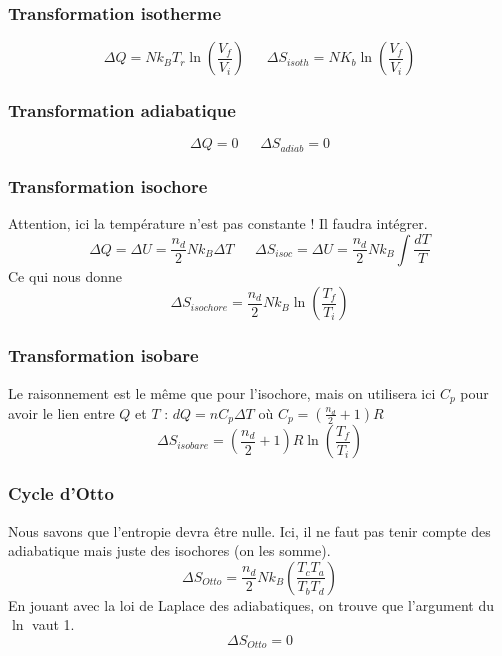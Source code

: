 \documentclass	[11pt, a4paper, openany]{book}
\begin{document}
\subsubsection{Transformation isotherme}
\begin{equation}
	\Delta Q = Nk_BT_r\ln\left(\frac{V_f}{V_i}\right)\ \ \ \ \ \ \ \Delta S_{isoth} = NK_b\ln\left(\frac{V_f}{V_i}\right)
\end{equation}

\subsubsection{Transformation adiabatique}
\begin{equation}
	\Delta Q =0\ \ \ \ \ \ \ \Delta S_{adiab} = 0
\end{equation}

\subsubsection{Transformation isochore}
Attention, ici la température n'est pas constante ! Il faudra intégrer.
\begin{equation}
	\Delta Q = \Delta U = \frac{n_d}{2}Nk_B\Delta T\ \ \ \ \ \ \ \Delta S_{isoc} = \Delta U = \frac{n_d}{2}Nk_B\int \frac{dT}{T}
\end{equation}
Ce qui nous donne
\begin{equation}
	\Delta S_{isochore} = \frac{n_d}{2}Nk_B\ln\left(\frac{T_f}{T_i}\right)
\end{equation}


\subsubsection{Transformation isobare}
Le raisonnement est le même que pour l'isochore, mais on utilisera ici $C_p$ pour avoir le lien entre $Q$ et $T$ : $dQ = nC_p \Delta T$ où $C_p = (\frac{n_d}{2}+1)R$
\begin{equation}
	\Delta S_{isobare} = \left(\frac{n_d}{2}+1\right)R\ln\left(\frac{T_f}{T_i}\right)
\end{equation}

\subsubsection{Cycle d'Otto}
Nous savons que l'entropie devra être nulle. Ici, il ne faut pas tenir compte des adiabatique mais juste des isochores (on les somme).
\begin{equation}
	\Delta S_{Otto} = \frac{n_d}{2}Nk_B\left(\frac{T_cT_a}{T_bT_d}\right)
\end{equation}
En jouant avec la loi de Laplace des adiabatiques, on trouve que l'argument du $\ln$ vaut 1.
\begin{equation}
	\Delta S_{Otto} = 0
\end{equation}
\end{document}
